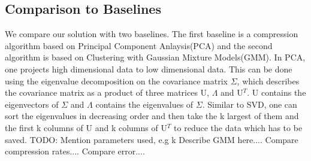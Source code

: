 \subsection{Comparison to Baselines}
We compare our solution with two baselines. The first baseline is a compression algorithm based on Principal Component Anlaysis(PCA) and the second algorithm is based on Clustering with Gaussian Mixture Models(GMM).  
\newline
In PCA, one projects high dimensional data to low dimensional data. This can be done using the eigenvalue decomposition on the covariance matrix $\Sigma$, which describes the covariance matrix as a product of three matrices U, $\Lambda$ and U$^T$. U contains the eigenvectors of  $\Sigma$ and $\Lambda$ contains the eigenvalues of $\Sigma$. Similar to SVD, one can sort the eigenvalues in decreasing order and then take the k largest of them and the first k columns of U and k columns of U$^T$ to reduce the data which has to be saved. 
\newline
TODO: Mention parameters used, e.g k
\newline
Describe GMM here.... 
\newline
Compare compression rates.... 
\newline
Compare error....
